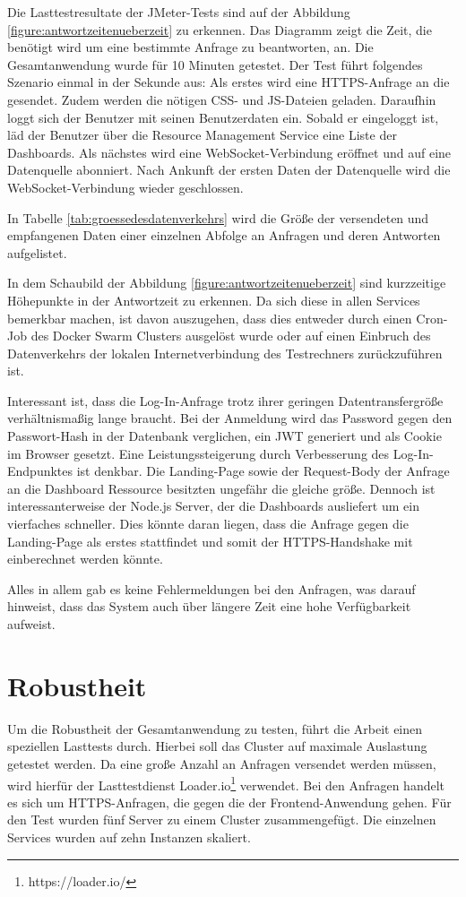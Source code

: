 Die Lasttestresultate der JMeter-Tests sind auf der Abbildung \ref{figure:antwortzeitenueberzeit}
zu erkennen. Das Diagramm zeigt die Zeit, die benötigt wird um eine bestimmte Anfrage zu beantworten, an.
Die Gesamtanwendung wurde für 10 Minuten getestet.
Der Test führt folgendes Szenario einmal in der Sekunde aus:
Als erstes wird eine HTTPS-Anfrage an die  gesendet.
Zudem werden die nötigen CSS- und JS-Dateien geladen.
Daraufhin loggt sich der Benutzer mit seinen Benutzerdaten ein.
Sobald er eingeloggt ist, läd der Benutzer über die Resource Management Service
eine Liste der Dashboards. Als nächstes wird eine WebSocket-Verbindung eröffnet
und auf eine Datenquelle abonniert. Nach Ankunft der ersten Daten der
Datenquelle wird die WebSocket-Verbindung wieder geschlossen.

In Tabelle \ref{tab:groessedesdatenverkehrs} wird die Größe der versendeten und empfangenen 
Daten einer einzelnen Abfolge an Anfragen und deren Antworten aufgelistet.

In dem Schaubild der Abbildung \ref{figure:antwortzeitenueberzeit}
sind kurzzeitige Höhepunkte in der Antwortzeit zu erkennen. Da sich diese
in allen Services bemerkbar machen, ist davon auszugehen, dass dies
entweder durch einen Cron-Job des Docker Swarm Clusters ausgelöst wurde oder auf einen
Einbruch des Datenverkehrs der lokalen Internetverbindung des Testrechners zurückzuführen
ist.

Interessant ist, dass die Log-In-Anfrage trotz ihrer geringen Datentransfergröße verhältnismaßig
lange braucht. Bei der Anmeldung wird das Password gegen den Passwort-Hash in der Datenbank verglichen,
ein JWT generiert und als Cookie im Browser gesetzt. Eine Leistungssteigerung durch Verbesserung
des Log-In-Endpunktes ist denkbar. Die Landing-Page  sowie der Request-Body der
Anfrage an die Dashboard Ressource besitzten ungefähr die gleiche größe. Dennoch ist interessanterweise
der Node.js Server, der die Dashboards ausliefert um ein vierfaches schneller. Dies könnte daran liegen,
dass die Anfrage gegen die Landing-Page als erstes stattfindet und somit der HTTPS-Handshake
mit einberechnet werden könnte.

Alles in allem gab es keine Fehlermeldungen bei den Anfragen, was darauf hinweist, dass das System
auch über längere Zeit eine hohe Verfügbarkeit aufweist.

\section{Robustheit}
\label{sec:robustheit}
Um die Robustheit der Gesamtanwendung zu testen, führt die Arbeit
einen speziellen Lasttests durch. Hierbei soll das Cluster auf maximale
Auslastung getestet werden. Da eine große Anzahl an Anfragen versendet werden müssen,
wird hierfür der Lasttestdienst Loader.io\footnote{https://loader.io/} verwendet.
Bei den Anfragen handelt es sich um HTTPS-Anfragen, die gegen
die  der Frontend-Anwendung gehen. Für den Test
wurden fünf Server zu einem Cluster zusammengefügt. Die einzelnen Services wurden
auf zehn Instanzen skaliert.


